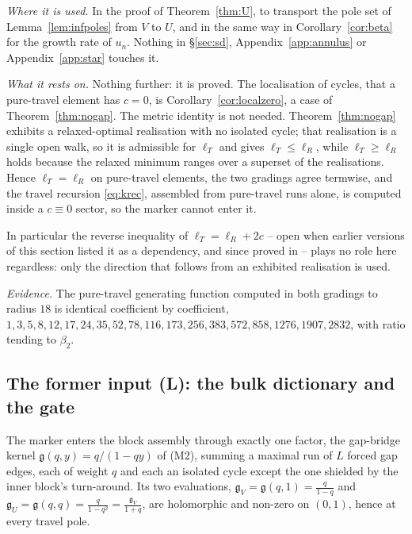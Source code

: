 \documentclass[11pt]{article}
\theoremstyle{plain}
\theoremstyle{definition}
\theoremstyle{remark}
\begin{document}
\emph{Where it is used.} In the proof of Theorem~\ref{thm:U}, to transport the pole set of
Lemma~\ref{lem:infpoles} from $V$ to $U$, and in the same way in Corollary~\ref{cor:beta} for the
growth rate of $u_n$. Nothing in \S\ref{sec:sd}, Appendix~\ref{app:annulus} or
Appendix~\ref{app:star} touches it.

\emph{What it rests on.} Nothing further: it is proved. The localisation of cycles, that a
pure-travel element has $c=0$, is Corollary~\ref{cor:localzero}, a case of
Theorem~\ref{thm:nogap}. The metric identity is not needed. Theorem~\ref{thm:nogap} exhibits a
relaxed-optimal realisation with no isolated cycle; that realisation is a single open walk, so it is
admissible for $\ell_T$ and gives $\ell_T\le\ell_R$, while $\ell_T\ge\ell_R$ holds because the
relaxed minimum ranges over a superset of the realisations. Hence $\ell_T=\ell_R$ on pure-travel
elements, the two gradings agree termwise, and the travel recursion \eqref{eq:krec}, assembled from
pure-travel runs alone, is computed inside a $c\equiv0$ sector, so the marker cannot enter it.

In particular the reverse inequality of $\ell_T=\ell_R+2c$ -- open when earlier versions of this
section listed it as a dependency, and since proved in \cite{Bonfioli2026a} -- plays no role here
regardless: only the direction that follows from an exhibited realisation is used.

\emph{Evidence.} The pure-travel generating function computed in both gradings to radius $18$ is
identical coefficient by coefficient,
$1,3,5,8,12,17,24,35,52,78,116,173,256,383,572,858,1276,1907,2832$, with ratio tending to
$\beta_2$.

\subsection{The former input \textup{(L)}: the bulk dictionary and the gate}\label{sec:inputL}

The marker enters the block assembly through exactly one factor, the gap-bridge kernel
$\mathfrak g(q,y)=q/(1-qy)$ of \textup{(M2)}, summing a maximal run of $L$ forced gap edges, each
of weight $q$ and each an isolated cycle except the one shielded by the inner block's turn-around.
Its two evaluations, $\mathfrak g_V=\mathfrak g(q,1)=\tfrac{q}{1-q}$ and
$\mathfrak g_U=\mathfrak g(q,q)=\tfrac{q}{1-q^2}=\tfrac{\mathfrak g_V}{1+q}$, are holomorphic and
non-zero on $(0,1)$, hence at every travel pole.
\end{document}
